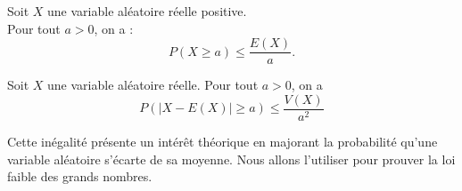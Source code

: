 \documentclass{book}
\begin{document}
%

\begin{Proposition}
Soit $X$ une variable aléatoire réelle positive.\\
Pour tout $a > 0$, on a :
\[ P(X\geq a) \leq \frac{E(X)}{a}.\]
\end{Proposition}
\begin{Proposition}
Soit $X$ une variable aléatoire réelle.
Pour tout $a>0$, on a
\[ P( |X-E(X)| \geq a ) \leq \frac{V(X)}{a^2} \]
\end{Proposition}
Cette inégalité présente un intérêt théorique en majorant la
probabilité qu'une variable aléatoire s'écarte de sa moyenne. Nous allons l'utiliser pour prouver la loi faible des grands
nombres.
\end{document}
